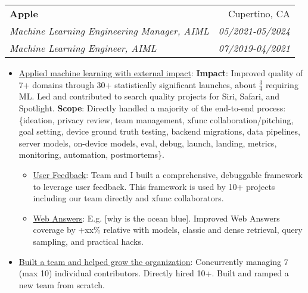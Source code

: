 \documentclass[letterpaper,9pt]{article}
\makeatletter
\newcommand{\resumeItem}[2]{
    \item\small{
        \underline{#1}{: #2 \vspace{-2pt}}
    }
}
\newcommand{\resumeDoubleSubheading}[6]{
    \vspace{-1pt}\item
    \begin{tabular*}{0.97\textwidth}[t]{l@{\extracolsep{\fill}}r}
        \textbf{#1} & #2 \\
        \textit{\small#3} & \textit{\small #4} \\
        \textit{\small#5} & \textit{\small #6} \\
    \end{tabular*}\vspace{-5pt}
}
\newcommand{\resumeItemListStart}{\begin{itemize}}
\newcommand{\resumeItemListEnd}{\end{itemize}\vspace{-5pt}}
\makeatother
\begin{document}
    \resumeDoubleSubheading
      {Apple}{Cupertino, CA}
      {Machine Learning Engineering Manager, AIML}{05/2021-05/2024}
      {Machine Learning Engineer, AIML}{07/2019-04/2021}
      \resumeItemListStart
        \resumeItem{Applied machine learning with external impact}
          {
              \newline \textbf{Impact}: Improved quality of 7+ domains through 30+ statistically significant launches, about \(\frac{3}{4}\) requiring ML.
              Led and contributed to search quality projects for Siri, Safari, and Spotlight.
              \newline \textbf{Scope}: Directly handled a majority of the end-to-end process: \{ideation, privacy review, team management, xfunc collaboration/pitching, goal setting, device ground truth testing, backend migrations, data pipelines, server models, on-device models, eval, debug, launch, landing, metrics, monitoring, automation, postmortems\}.
          }
          \resumeItemListStart
            \resumeItem{User Feedback}
            {
                Team and I built a comprehensive, debuggable framework to leverage user feedback. This framework is used by 10+ projects including our team directly and xfunc collaborators.
            }
            \vspace{4pt}
            \resumeItem{Web Answers}{E.g. [why is the ocean blue]. Improved Web Answers coverage by +xx\% relative with models, classic and dense retrieval, query sampling, and practical hacks.}
          \resumeItemListEnd
          \vspace{4pt}
        \resumeItem{Built a team and helped grow the organization}
          {
              Concurrently managing 7 (max 10) individual contributors. Directly hired 10+. Built and ramped a new team from scratch.}
      \resumeItemListEnd
      
\end{document}

